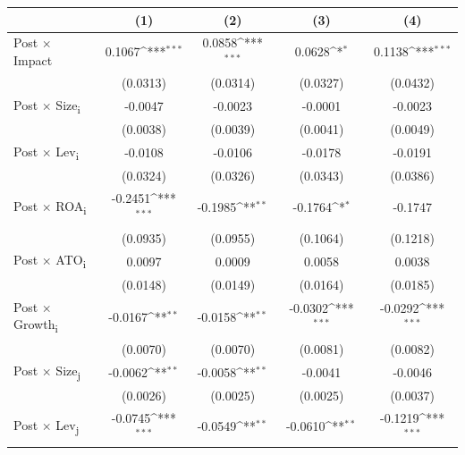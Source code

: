 {
\def\sym#1{\ifmmode^{#1}\else\(^{#1}\)\fi}
\begin{tabular}{l*{4}{c}}
\toprule
            &\multicolumn{1}{c}{(1)}         &\multicolumn{1}{c}{(2)}         &\multicolumn{1}{c}{(3)}         &\multicolumn{1}{c}{(4)}         \\
\midrule
Post \(\times\) Impact&      0.1067\sym{***}&      0.0858\sym{***}&      0.0628\sym{*}  &      0.1138\sym{***}\\
            &    (0.0313)         &    (0.0314)         &    (0.0327)         &    (0.0432)         \\
\addlinespace
Post \(\times\) Size\textsubscript{i}&     -0.0047         &     -0.0023         &     -0.0001         &     -0.0023         \\
            &    (0.0038)         &    (0.0039)         &    (0.0041)         &    (0.0049)         \\
\addlinespace
Post \(\times\) Lev\textsubscript{i}&     -0.0108         &     -0.0106         &     -0.0178         &     -0.0191         \\
            &    (0.0324)         &    (0.0326)         &    (0.0343)         &    (0.0386)         \\
\addlinespace
Post \(\times\) ROA\textsubscript{i}&     -0.2451\sym{***}&     -0.1985\sym{**} &     -0.1764\sym{*}  &     -0.1747         \\
            &    (0.0935)         &    (0.0955)         &    (0.1064)         &    (0.1218)         \\
\addlinespace
Post \(\times\) ATO\textsubscript{i}&      0.0097         &      0.0009         &      0.0058         &      0.0038         \\
            &    (0.0148)         &    (0.0149)         &    (0.0164)         &    (0.0185)         \\
\addlinespace
Post \(\times\) Growth\textsubscript{i}&     -0.0167\sym{**} &     -0.0158\sym{**} &     -0.0302\sym{***}&     -0.0292\sym{***}\\
            &    (0.0070)         &    (0.0070)         &    (0.0081)         &    (0.0082)         \\
\addlinespace
Post \(\times\) Size\textsubscript{j}&     -0.0062\sym{**} &     -0.0058\sym{**} &     -0.0041         &     -0.0046         \\
            &    (0.0026)         &    (0.0025)         &    (0.0025)         &    (0.0037)         \\
\addlinespace
Post \(\times\) Lev\textsubscript{j}&     -0.0745\sym{***}&     -0.0549\sym{**} &     -0.0610\sym{**} &     -0.1219\sym{***}\\

\end{tabular}}
